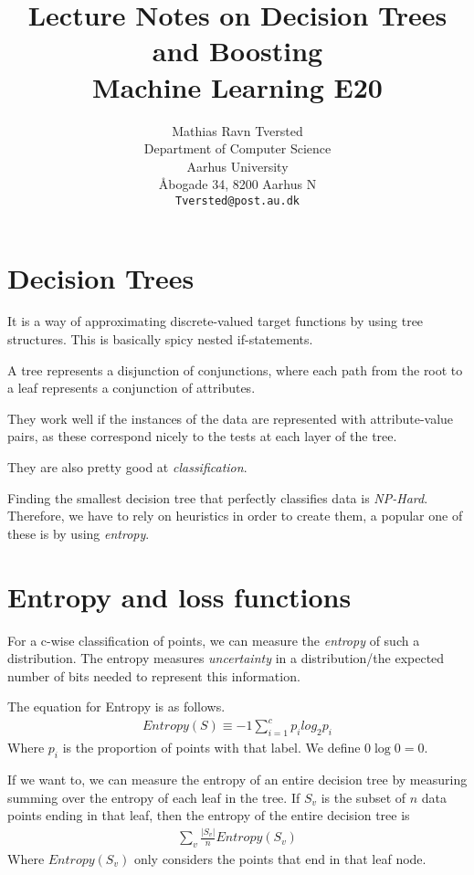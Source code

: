 \documentclass{article}
\title{Lecture Notes on Decision Trees and Boosting\\Machine Learning E20}
\author{
 Mathias Ravn Tversted \\
  Department of Computer Science\\
  Aarhus University\\
  Åbogade 34, 8200 Aarhus N \\
  \texttt{Tversted@post.au.dk} \\
}
\begin{document}
\maketitle
\tableofcontents
\newpage

\section{Decision Trees}
  It is a way of approximating discrete-valued target functions by using tree structures. This is basically spicy nested if-statements.

  A tree represents a disjunction of conjunctions, where each path from the root to a leaf represents a conjunction of attributes.

  They work well if the instances of the data are represented with attribute-value pairs, as these correspond nicely to the tests at each layer of the tree.

  They are also pretty good at \emph{classification}. 


  Finding the smallest decision tree that perfectly classifies data is \emph{NP-Hard}. Therefore, we have to rely on heuristics in order to create them, a popular one of these is by using \emph{entropy}. 

\section{Entropy and loss functions}

  For a c-wise classification of points, we can measure the \emph{entropy} of such a distribution. The entropy measures \emph{uncertainty} in a distribution/the expected number of bits needed to represent this information. 

  The equation for Entropy is as follows.
  \begin{align}
    Entropy(S) \equiv -1 \sum_{i=1}^c p_i log_2p_i
  \end{align}
  Where $p_i$ is the proportion of points with that label. We define $0 \log 0 = 0$. 

  If we want to, we can measure the entropy of an entire decision tree by measuring summing over the entropy of each leaf in the tree. If $S_v$ is the subset of $n$ data points ending in that leaf, then the entropy of the entire decision tree is 
  \begin{align}
    \sum_{v}{\frac{|S_v|}{n}Entropy(S_v)}
  \end{align}
  Where $Entropy(S_v)$ only considers the points that end in that leaf node. 
\end{document}
